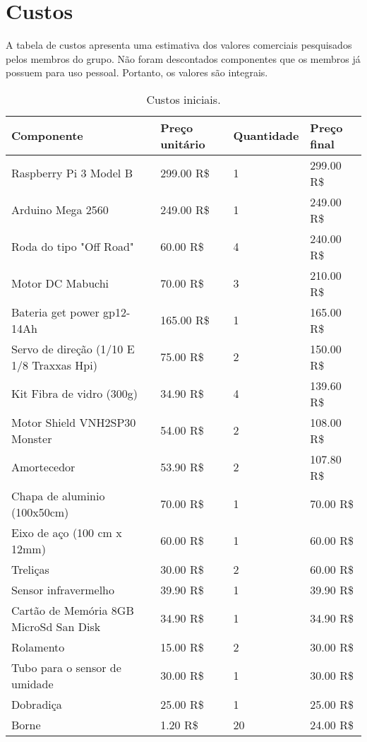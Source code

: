 \chapter{Custos}

A tabela de custos apresenta uma estimativa dos valores comerciais
pesquisados pelos membros do grupo. Não foram descontados componentes
que os membros já possuem para uso pessoal. Portanto, os valores
são integrais.

\begin{table}[!htbp]
\begin{center}
\caption{\label{tab:custos}Custos iniciais.}
\begin{tabular}{|p{4cm}|p{4cm}|p{3cm}|p{4cm}|}
\hline
\textbf{Componente} & \textbf{Preço unitário} & \textbf{Quantidade} & \textbf{Preço final}\\\hline\hline
Raspberry Pi 3 Model B & 299.00 R\$ & 1 & 299.00 R\$\\\hline
Arduino Mega 2560 & 249.00 R\$ & 1 & 249.00 R\$\\\hline
Roda do tipo "Off Road" & 60.00 R\$ & 4 & 240.00 R\$\\\hline
Motor DC Mabuchi & 70.00 R\$ & 3 & 210.00 R\$\\\hline
Bateria get power gp12-14Ah & 165.00 R\$ & 1 & 165.00 R\$\\\hline
Servo de direção (1/10 E 1/8 Traxxas Hpi) & 75.00 R\$ & 2 & 150.00 R\$\\\hline
Kit Fibra de vidro (300g) & 34.90 R\$ & 4 & 139.60 R\$\\\hline
Motor Shield VNH2SP30 Monster & 54.00 R\$ & 2 & 108.00 R\$\\\hline
Amortecedor & 53.90 R\$ & 2 & 107.80 R\$\\\hline
Chapa de aluminio (100x50cm) & 70.00 R\$ & 1 & 70.00 R\$\\\hline
Eixo de aço (100 cm x 12mm) & 60.00 R\$ & 1 & 60.00 R\$\\\hline
Treliças & 30.00 R\$ & 2 & 60.00 R\$\\\hline
Sensor infravermelho & 39.90 R\$ & 1 & 39.90 R\$\\\hline
Cartão de Memória 8GB MicroSd San Disk  & 34.90 R\$ & 1 & 34.90 R\$\\\hline
Rolamento & 15.00 R\$ & 2 & 30.00 R\$\\\hline
Tubo para o sensor de umidade & 30.00 R\$ & 1 & 30.00 R\$\\\hline
Dobradiça & 25.00 R\$ & 1 & 25.00 R\$\\\hline
Borne & 1.20 R\$ & 20 & 24.00 R\$\\\hline

\end{tabular}
\end{center}
\end{table}
